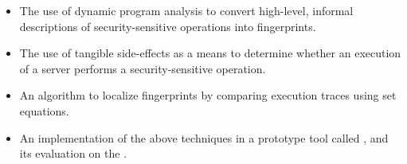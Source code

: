 \begin{itemize}
\item The use of dynamic program analysis to convert high-level, informal
descriptions of security-sensitive operations into fingerprints.

\item The use of tangible side-effects as a means to determine whether an
execution of a server performs a security-sensitive operation.

\item An algorithm to localize fingerprints by comparing execution traces
using set equations.

\item An implementation of the above techniques in a prototype tool called
\aid, and its evaluation on the \xserver.

\end{itemize}
